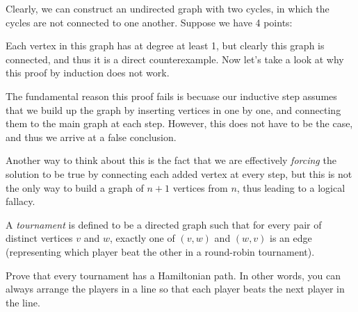 \documentclass[11pt]{article}
\begin{document}
\begin{solution}
    Clearly, we can construct an undirected graph with two cycles, in which the cycles are not connected to one another. Suppose we have 4 points:
    

    \begin{center}
    \end{center}

    Each vertex in this graph has at degree at least 1, but clearly this graph is connected, and thus it is a direct counterexample. Now let's take a look at why this proof by induction does not work.

    The fundamental reason this proof fails is becuase our inductive step assumes that we build up the graph by inserting vertices in one by one, and connecting them to the main graph at each step. However, this does not have to be the case, and thus we arrive at a false conclusion.

    Another way to think about this is the fact that we are effectively \textit{forcing} the solution to be true by connecting each added vertex at every step, but this is not the only way to build a graph of $n+1$ vertices from $n$, thus leading to a logical fallacy.

\end{solution}
\pagebreak
{}  

A \emph{tournament} is defined to be a directed graph such that for every pair
of distinct vertices $v$ and $w$, exactly one of $(v,w)$ and $(w,v)$ is an edge
(representing which player beat the other in a round-robin tournament).

Prove that every tournament has a Hamiltonian path. In other words, you can always
arrange the players in a line so that each player beats the next player in the
line.
\end{document}
